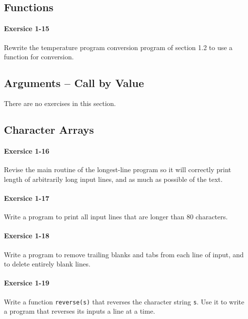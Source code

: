 			\hfill{}\cite[p.~24]{knr}

	\newpage
	\subsection{Functions}
		\paragraph{Exersice 1-15}
			Rewrite the temperature program conversion program of section 1.2 to
			use a function for conversion.
	
			\hfill{}\cite[p.~27]{knr}

	\newpage
	\subsection{Arguments -- Call by Value}
	There are no exercises in this section.
	
	\newpage
	\subsection{Character Arrays}
		\paragraph{Exersice 1-16}
			Revise the main routine of the longest-line program so it will
			correctly print length of arbitrarily long input lines, and as
			much as possible of the text.
	
			\hfill{}\cite[p.~30]{knr}

		\paragraph{Exersice 1-17}
			Write a program to print all input lines that are longer than 80
			characters.
	
			\hfill{}\cite[p.~31]{knr}

		\paragraph{Exersice 1-18}
			Write a program to remove trailing blanks and tabs from each line
			of input, and to delete entirely blank lines.

			\hfill{}\cite[p.~31]{knr}

		\paragraph{Exersice 1-19}
			Write a function \lstinline{reverse(s)} that reverses the
			character string \lstinline{s}. Use it to write a program that
			reverses its inputs a line at a time.
	
